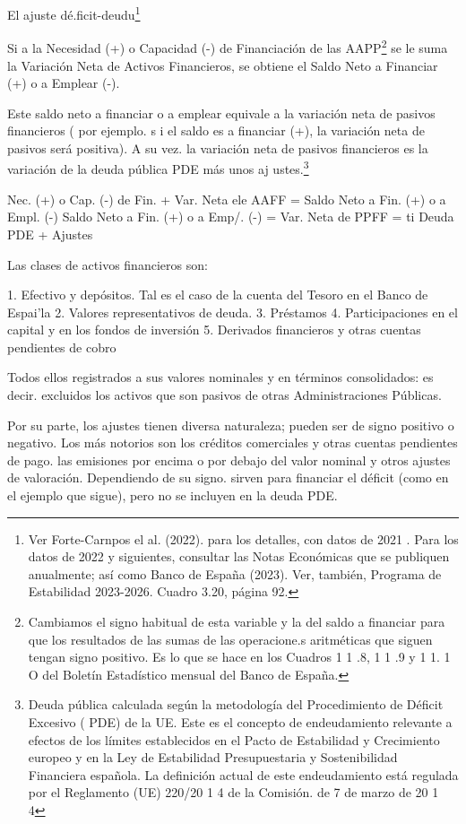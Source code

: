 \documentclass[10pt,a4paper]{article}
\begin{document}
El ajuste dé.ficit-deudu\footnote{%
    Ver Forte-Carnpos el al. (2022). para los detalles, con datos de 2021 . Para los datos de 2022 y siguientes, consultar las Notas Económicas que se publiquen anualmente; así como Banco de España (2023). Ver, también, Programa de Estabilidad 2023-2026. Cuadro 3.20, página 92.
}

Si a la Necesidad (+) o Capacidad (-) de Financiación de las AAPP\footnote{%
    Cambiamos el signo habitual de esta variable y la del saldo a financiar para que los resultados de las sumas de las operacione.s aritméticas que siguen tengan signo positivo. Es lo que se hace en los Cuadros 1 1 .8, 1 1 .9 y 1 1. 1 O del Boletín Estadístico mensual del Banco de España.
} se le suma la Variación Neta de Activos Financieros, se obtiene el Saldo Neto a Financiar (+) o a Emplear (-).

Este saldo neto a financiar o a emplear equivale a la variación neta de pasivos financieros ( por ejemplo. s i el saldo es a financiar (+), la variación neta de pasivos será positiva). A su vez. la variación neta de pasivos financieros es la variación de la deuda pública PDE más unos aj ustes.\footnote{%
    Deuda pública calculada según la metodología del Procedimiento de Déficit Excesivo ( PDE) de la UE. Este es el concepto de endeudamiento relevante a efectos de los límites establecidos en el Pacto de Estabilidad y Crecimiento europeo y en la Ley de Estabilidad Presupuestaria y Sostenibilidad Financiera española. La definición actual de este endeudamiento está regulada por el Reglamento (UE) 220/20 1 4 de la Comisión. de 7 de marzo de 20 1 4
}

Nec. (+) o Cap. (-) de Fin. + Var. Neta ele AAFF = Saldo Neto a Fin. (+) o a Empl. (-) Saldo Neto a Fin. (+) o a Emp/. (-) = Var. Neta de PPFF = ti Deuda PDE + Ajustes

Las clases de activos financieros son:

1. Efectivo y depósitos. Tal es el caso de la cuenta del Tesoro en el Banco de Espai'la
2. Valores representativos de deuda.
3. Préstamos
4. Participaciones en el capital y en los fondos de inversión
5. Derivados financieros y otras cuentas pendientes de cobro

Todos ellos registrados a sus valores nominales y en términos consolidados: es decir. excluidos los activos que son pasivos de otras Administraciones Públicas.

Por su parte, los ajustes tienen diversa naturaleza; pueden ser de signo positivo o negativo. Los más notorios son los créditos comerciales y otras cuentas pendientes de pago. las emisiones por encima o por debajo del valor nominal y otros ajustes de valoración. Dependiendo de su signo. sirven para financiar el déficit (como en el ejemplo que sigue), pero no se incluyen en la deuda PDE.
\end{document}
